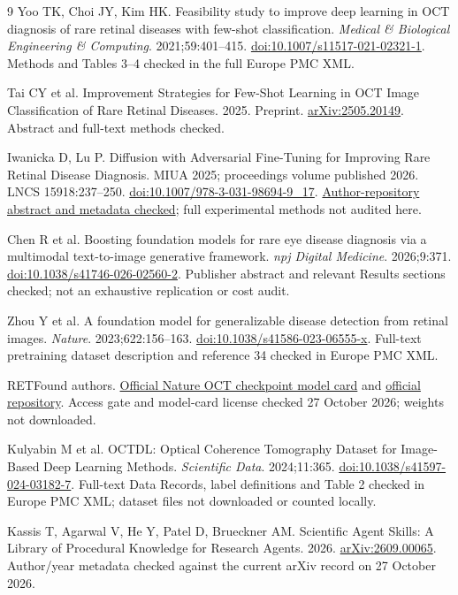 \documentclass[11pt,a4paper]{article}
\begin{document}
\begin{thebibliography}{9}
 Yoo TK, Choi JY, Kim HK. Feasibility study to improve deep
learning in OCT diagnosis of rare retinal diseases with few-shot classification.
\emph{Medical \& Biological Engineering \& Computing}. 2021;59:401--415.
\href{https://doi.org/10.1007/s11517-021-02321-1}{doi:10.1007/s11517-021-02321-1}.
Methods and Tables 3--4 checked in the full Europe PMC XML.

 Tai CY et al. Improvement Strategies for Few-Shot Learning in
OCT Image Classification of Rare Retinal Diseases. 2025. Preprint.
\href{https://arxiv.org/abs/2505.20149}{arXiv:2505.20149}.
Abstract and full-text methods checked.

 Iwanicka D, Lu P. Diffusion with Adversarial Fine-Tuning for
Improving Rare Retinal Disease Diagnosis. MIUA 2025; proceedings volume
published 2026. LNCS 15918:237--250.
\href{https://doi.org/10.1007/978-3-031-98694-9_17}{doi:10.1007/978-3-031-98694-9\_17}.
\href{https://eprints.whiterose.ac.uk/id/eprint/228674/}{Author-repository abstract and metadata checked};
full experimental methods not audited here.

 Chen R et al. Boosting foundation models for rare eye disease
diagnosis via a multimodal text-to-image generative framework.
\emph{npj Digital Medicine}. 2026;9:371.
\href{https://doi.org/10.1038/s41746-026-02560-2}{doi:10.1038/s41746-026-02560-2}.
Publisher abstract and relevant Results sections checked; not an exhaustive
replication or cost audit.

 Zhou Y et al. A foundation model for generalizable disease
detection from retinal images. \emph{Nature}. 2023;622:156--163.
\href{https://doi.org/10.1038/s41586-023-06555-x}{doi:10.1038/s41586-023-06555-x}.
Full-text pretraining dataset description and reference 34 checked in Europe PMC XML.

 RETFound authors.
\href{https://huggingface.co/YukunZhou/RETFound_mae_natureOCT}{Official Nature OCT checkpoint model card}
and \href{https://github.com/rmaphoh/RETFound}{official repository}.
Access gate and model-card license checked 27 October 2026; weights not downloaded.

 Kulyabin M et al. OCTDL: Optical Coherence Tomography Dataset
for Image-Based Deep Learning Methods. \emph{Scientific Data}. 2024;11:365.
\href{https://doi.org/10.1038/s41597-024-03182-7}{doi:10.1038/s41597-024-03182-7}.
Full-text Data Records, label definitions and Table 2 checked in Europe PMC XML;
dataset files not downloaded or counted locally.

 Kassis T, Agarwal V, He Y, Patel D, Brueckner AM.
Scientific Agent Skills: A Library of Procedural Knowledge for Research Agents.
2026. \href{https://doi.org/10.48550/arXiv.2609.00065}{arXiv:2609.00065}.
Author/year metadata checked against the current arXiv record on 27 October 2026.
\end{thebibliography}
\end{document}
